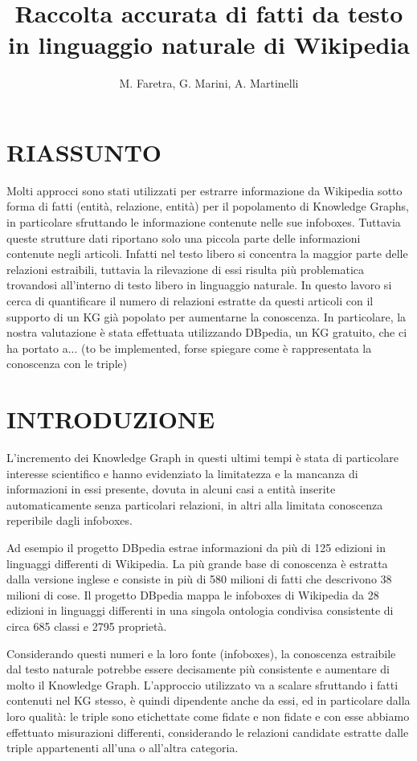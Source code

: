 \documentclass[10pt,a4paper,twocolumn]{article}
\author{M. Faretra, G. Marini, A. Martinelli}
\title{Raccolta accurata di fatti da testo in linguaggio naturale di Wikipedia}
\begin{document}
	
\maketitle
		
\section*{RIASSUNTO}
		
Molti approcci sono stati utilizzati per estrarre informazione da Wikipedia sotto forma di fatti (entità, relazione, entità) per il popolamento di Knowledge Graphs, in particolare sfruttando le informazione contenute nelle sue infoboxes. Tuttavia queste strutture dati riportano solo una piccola parte delle informazioni contenute negli articoli. Infatti nel testo libero si concentra la maggior parte delle relazioni estraibili, tuttavia la rilevazione di essi risulta più problematica trovandosi all'interno di testo libero in linguaggio naturale. In questo lavoro si cerca di quantificare il numero di relazioni estratte da questi articoli con il supporto di un KG già popolato per aumentarne la conoscenza. In particolare, la nostra valutazione è stata effettuata utilizzando DBpedia, un KG gratuito, che ci ha portato a... (to be implemented, forse spiegare come è rappresentata la conoscenza con le triple)
		
\section{INTRODUZIONE} 
		
L'incremento dei Knowledge Graph in questi ultimi tempi è stata di particolare interesse scientifico e hanno evidenziato la limitatezza e la mancanza di informazioni in essi presente, dovuta in alcuni casi a entità inserite automaticamente senza particolari relazioni, in altri alla limitata conoscenza reperibile dagli infoboxes.
		
Ad esempio il progetto DBpedia estrae informazioni da più di 125 edizioni in linguaggi differenti di Wikipedia. La più grande base di conoscenza è estratta dalla versione inglese e consiste in più di 580 milioni di fatti che descrivono 38 milioni di cose. Il progetto DBpedia mappa le infoboxes di Wikipedia da 28 edizioni in linguaggi differenti in una singola ontologia condivisa consistente di circa 685 classi e 2795 proprietà. 
		
Considerando questi numeri e la loro fonte (infoboxes), la conoscenza estraibile dal testo naturale potrebbe essere decisamente più consistente e aumentare di molto il Knowledge Graph. L'approccio utilizzato va a scalare sfruttando i fatti contenuti nel KG stesso, è quindi dipendente anche da essi, ed in particolare dalla loro qualità: le triple sono etichettate come fidate e non fidate e con esse abbiamo effettuato misurazioni differenti, considerando le relazioni candidate estratte dalle triple appartenenti all'una o all'altra categoria.
		
\end{document}
